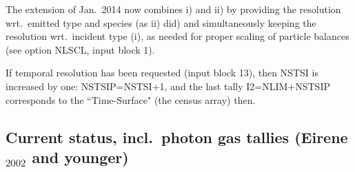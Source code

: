 The extension of Jan.\ 2014 now combines i) and ii) by providing the resolution
wrt.\ emitted type and species (as ii) did) and simultaneously keeping the
resolution wrt.\ incident type (i), as needed for proper scaling of particle
balances (see option NLSCL, input block 1).

\medskip

If temporal resolution has been requested (input block 13), then NSTSI is
increased by one: NSTSIP=NSTSI+1, and the last tally I2=NLIM+NSTSIP corresponds
to the ``Time-Surface" (the census array) then.


\subsection{Current status, incl.\ photon gas tallies (Eirene\texorpdfstring{$_{2002}
    $}{2002} and younger)}\label{sec.tables-new}


